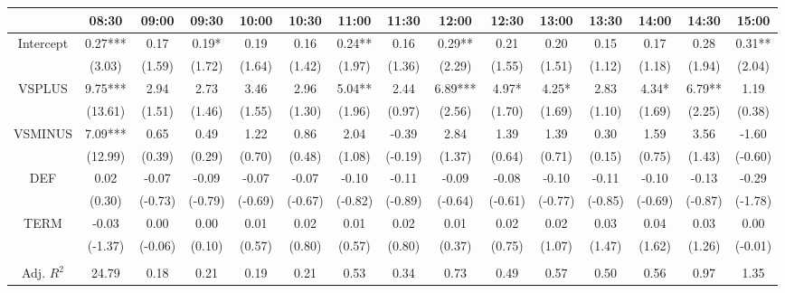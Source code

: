 \begin{table}[h]
\begin{threeparttable}
\begin{tabular}{ccccccccccccccc}
          & 08:30   & 09:00   & 09:30   & 10:00   & 10:30   & 11:00   & 11:30   & 12:00   & 12:30   & 13:00   & 13:30   & 14:00   & 14:30   & 15:00   \\ \midrule
Intercept & 0.27*** & 0.17    & 0.19*   & 0.19    & 0.16    & 0.24**  & 0.16    & 0.29**  & 0.21    & 0.20    & 0.15    & 0.17    & 0.28    & 0.31**  \\
          & (3.03)  & (1.59)  & (1.72)  & (1.64)  & (1.42)  & (1.97)  & (1.36)  & (2.29)  & (1.55)  & (1.51)  & (1.12)  & (1.18)  & (1.94)  & (2.04)  \\
VSPLUS    & 9.75*** & 2.94    & 2.73    & 3.46    & 2.96    & 5.04**  & 2.44    & 6.89*** & 4.97*   & 4.25*   & 2.83    & 4.34*   & 6.79**  & 1.19    \\
          & (13.61) & (1.51)  & (1.46)  & (1.55)  & (1.30)  & (1.96)  & (0.97)  & (2.56)  & (1.70)  & (1.69)  & (1.10)  & (1.69)  & (2.25)  & (0.38)  \\
VSMINUS   & 7.09*** & 0.65    & 0.49    & 1.22    & 0.86    & 2.04    & -0.39   & 2.84    & 1.39    & 1.39    & 0.30    & 1.59    & 3.56    & -1.60   \\
          & (12.99) & (0.39)  & (0.29)  & (0.70)  & (0.48)  & (1.08)  & (-0.19) & (1.37)  & (0.64)  & (0.71)  & (0.15)  & (0.75)  & (1.43)  & (-0.60) \\
DEF       & 0.02    & -0.07   & -0.09   & -0.07   & -0.07   & -0.10   & -0.11   & -0.09   & -0.08   & -0.10   & -0.11   & -0.10   & -0.13   & -0.29   \\
          & (0.30)  & (-0.73) & (-0.79) & (-0.69) & (-0.67) & (-0.82) & (-0.89) & (-0.64) & (-0.61) & (-0.77) & (-0.85) & (-0.69) & (-0.87) & (-1.78) \\
TERM      & -0.03   & 0.00    & 0.00    & 0.01    & 0.02    & 0.01    & 0.02    & 0.01    & 0.02    & 0.02    & 0.03    & 0.04    & 0.03    & 0.00    \\
          & (-1.37) & (-0.06) & (0.10)  & (0.57)  & (0.80)  & (0.57)  & (0.80)  & (0.37)  & (0.75)  & (1.07)  & (1.47)  & (1.62)  & (1.26)  & (-0.01) \\
          &         &         &         &         &         &         &         &         &         &         &         &         &         &         \\
Adj. $R^{2}$    & 24.79   & 0.18    & 0.21    & 0.19    & 0.21    & 0.53    & 0.34    & 0.73    & 0.49    & 0.57    & 0.50    & 0.56    & 0.97    & 1.35     \\

\bottomrule
\end{tabular}


\end{threeparttable}
\end{table}
